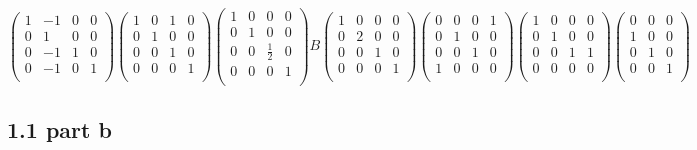\documentclass[a4paper,12pt]{article}
\begin{document}
 \begin{equation}
   \begin{pmatrix}
1 & -1 &0 & 0 \\
0 & 1 &0 & 0\\
0 & -1 &1 & 0\\
0 & -1 &0 & 1\\
\end{pmatrix}
 \begin{pmatrix}
1 & 0 &1 & 0 \\
0 & 1 &0 & 0\\
0 & 0 &1 & 0\\
0 & 0 &0 & 1\\
\end{pmatrix}
 \begin{pmatrix}
1 & 0 &0 & 0 \\
0 & 1 &0 & 0\\
0 & 0 &\frac{1}{2} & 0\\
0 & 0 &0 & 1\\
\end{pmatrix}B
\begin{pmatrix}
1 & 0 &0 & 0 \\
0 & 2 &0 & 0\\
0 & 0 &1 & 0\\
0 & 0 &0 & 1\\
\end{pmatrix}
\begin{pmatrix}
0 & 0 &0 & 1 \\
0 & 1 &0 & 0\\
0 & 0 &1 & 0\\
1 & 0 &0 & 0\\
\end{pmatrix}
\begin{pmatrix}
1 & 0 &0 & 0 \\
0 & 1 &0 & 0\\
0 & 0 &1 & 1\\
0 & 0 &0 & 0\\
\end{pmatrix}
\begin{pmatrix}
 0 &0 & 0 \\
 1&0 & 0\\
 0 &1 & 0\\
 0 &0 & 1\\
\end{pmatrix}
 \end{equation}


\subsection{1.1 part b}
\end{document}
